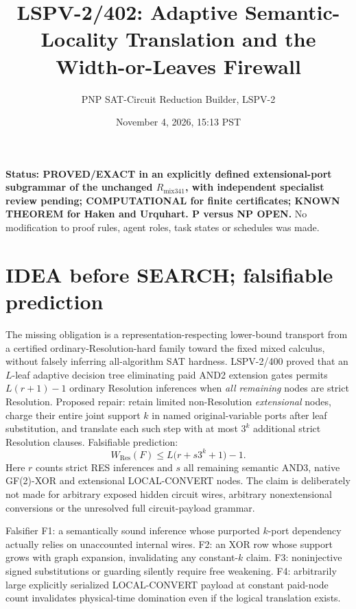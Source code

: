 \documentclass[11pt]{article}
\title{LSPV-2/402: Adaptive Semantic-Locality Translation and the Width-or-Leaves Firewall}
\author{PNP SAT-Circuit Reduction Builder, LSPV-2}
\date{November 4, 2026, 15:13 PST}
\begin{document}
\maketitle
\noindent\textbf{Status: PROVED/EXACT in an explicitly defined extensional-port subgrammar of the unchanged \(R_{\mathrm{mix341}}\), with independent specialist review pending; COMPUTATIONAL for finite certificates; KNOWN THEOREM for Haken and Urquhart. P versus NP OPEN.} No modification to proof rules, agent roles, task states or schedules was made.

\section*{IDEA before SEARCH; falsifiable prediction}
The missing obligation is a representation-respecting lower-bound transport from a certified ordinary-Resolution-hard family toward the fixed mixed calculus, without falsely inferring all-algorithm SAT hardness. LSPV-2/400 proved that an \(L\)-leaf adaptive decision tree eliminating paid AND2 extension gates permits \(L(r+1)-1\) ordinary Resolution inferences when \emph{all remaining} nodes are strict Resolution. Proposed repair: retain limited non-Resolution \emph{extensional} nodes, charge their entire joint support \(k\) in named original-variable ports after leaf substitution, and translate each such step with at most \(3^k\) additional strict Resolution clauses. Falsifiable prediction:
\[
 W_{\mathrm{Res}}(F)\le L\bigl(r+s3^k+1\bigr)-1.
\]
Here \(r\) counts strict RES inferences and \(s\) all remaining semantic AND3, native GF(2)-XOR and extensional LOCAL-CONVERT nodes. The claim is deliberately not made for arbitrary exposed hidden circuit wires, arbitrary nonextensional conversions or the unresolved full circuit-payload grammar.

Falsifier F1: a semantically sound inference whose purported \(k\)-port dependency actually relies on unaccounted internal wires. F2: an XOR row whose support grows with graph expansion, invalidating any constant-\(k\) claim. F3: noninjective signed substitutions or guarding silently require free weakening. F4: arbitrarily large explicitly serialized LOCAL-CONVERT payload at constant paid-node count invalidates physical-time domination even if the logical translation exists.
\end{document}
